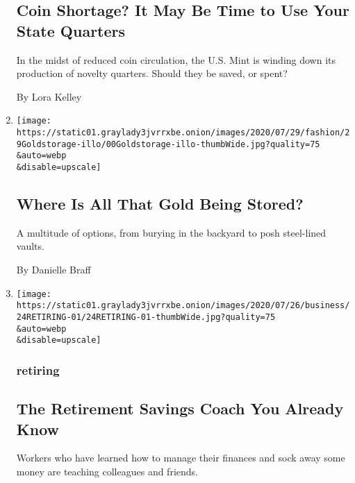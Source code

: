\begin{enumerate}
  \hypertarget{coin-shortage-it-may-be-time-to-use-your-state-quarters}{%
  \subsection{Coin Shortage? It May Be Time to Use Your State
  Quarters}\label{coin-shortage-it-may-be-time-to-use-your-state-quarters}}

  In the midst of reduced coin circulation, the U.S. Mint is winding
  down its production of novelty quarters. Should they be saved, or
  spent?

  By Lora Kelley
\item
  \href{/2020/07/28/style/gold-storage.html}{}

  \texttt{[image: https://static01.graylady3jvrrxbe.onion/images/2020/07/29/fashion/29Goldstorage-illo/00Goldstorage-illo-thumbWide.jpg?quality=75\\\&auto=webp\\\&disable=upscale]}

  \hypertarget{where-is-all-that-gold-being-stored}{%
  \subsection{Where Is All That Gold Being
  Stored?}\label{where-is-all-that-gold-being-stored}}

  A multitude of options, from burying in the backyard to posh
  steel-lined vaults.

  By Danielle Braff
\item
  \href{/2020/07/25/business/retirement-savings-mentor.html}{}

  \texttt{[image: https://static01.graylady3jvrrxbe.onion/images/2020/07/26/business/24RETIRING-01/24RETIRING-01-thumbWide.jpg?quality=75\\\&auto=webp\\\&disable=upscale]}

  \hypertarget{retiring}{%
  \subsubsection{retiring}\label{retiring}}

  \hypertarget{the-retirement-savings-coach-you-already-know}{%
  \subsection{The Retirement Savings Coach You Already
  Know}\label{the-retirement-savings-coach-you-already-know}}

  Workers who have learned how to manage their finances and sock away
  some money are teaching colleagues and friends.


\end{enumerate}

